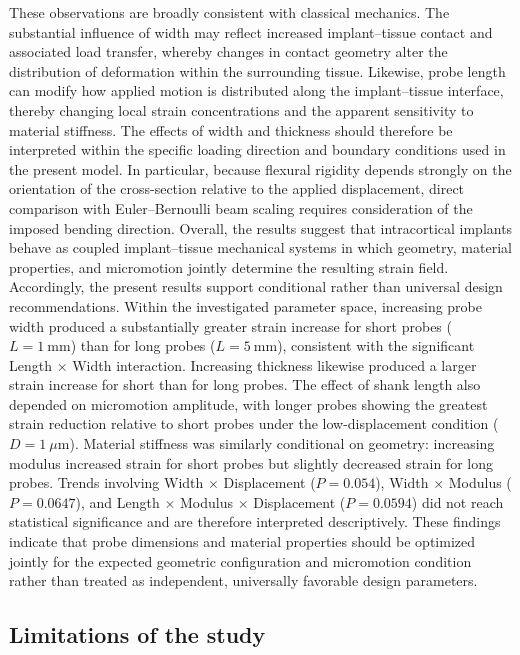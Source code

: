 \documentclass[fleqn,10pt]{wlscirep}
\begin{document}
These observations are broadly consistent with classical mechanics. The substantial influence of width may reflect increased implant--tissue contact and associated load transfer, whereby changes in contact geometry alter the distribution of deformation within the surrounding tissue. Likewise, probe length can modify how applied motion is distributed along the implant--tissue interface, thereby changing local strain concentrations and the apparent sensitivity to material stiffness. The effects of width and thickness should therefore be interpreted within the specific loading direction and boundary conditions used in the present model. In particular, because flexural rigidity depends strongly on the orientation of the cross-section relative to the applied displacement, direct comparison with Euler--Bernoulli beam scaling requires consideration of the imposed bending direction. Overall, the results suggest that intracortical implants behave as coupled implant--tissue mechanical systems in which geometry, material properties, and micromotion jointly determine the resulting strain field.
Accordingly, the present results support conditional rather than universal design recommendations. Within the investigated parameter space, increasing probe width produced a substantially greater strain increase for short probes ($L=1~\mathrm{mm}$) than for long probes ($L=5~\mathrm{mm}$), consistent with the significant Length $\times$ Width interaction. Increasing thickness likewise produced a larger strain increase for short than for long probes. The effect of shank length also depended on micromotion amplitude, with longer probes showing the greatest strain reduction relative to short probes under the low-displacement condition ($D=1~\mu\mathrm{m}$). Material stiffness was similarly conditional on geometry: increasing modulus increased strain for short probes but slightly decreased strain for long probes. Trends involving Width $\times$ Displacement ($P=0.054$), Width $\times$ Modulus ($P=0.0647$), and Length $\times$ Modulus $\times$ Displacement ($P=0.0594$) did not reach statistical significance and are therefore interpreted descriptively. These findings indicate that probe dimensions and material properties should be optimized jointly for the expected geometric configuration and micromotion condition rather than treated as independent, universally favorable design parameters.
\subsection{Limitations of the study}
\end{document}
